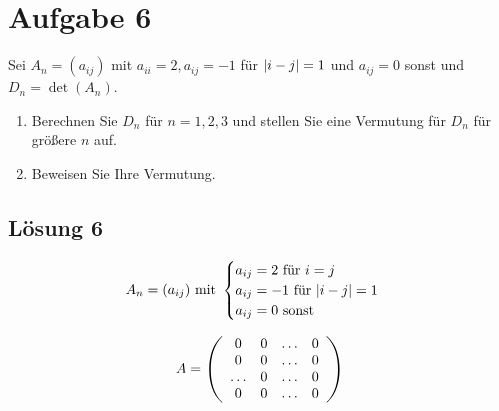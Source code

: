 \documentclass[main.tex]{subfiles}
\begin{document}
\section{Aufgabe 6}
Sei $A_n=(a_{ij})$ mit $a_{ii} = 2, a_{ij} = -1$ für $\abs{i-j} = 1$ und $a_{ij} = 0$ sonst und $D_n = \det(A_n)$.
\begin{enumerate}
    \item Berechnen Sie $D_n$ für $n= 1, 2, 3$ und stellen Sie eine Vermutung für $D_n$ für größere $n$ auf.
    \item Beweisen Sie Ihre Vermutung.
\end{enumerate}

\subsection{Lösung 6}

$$
    A_n =
            (a_{ij}) \text{ mit } \begin{cases}
                a_{ij} = 2 \text{ für } i = j \\
                a_{ij} = -1 \text{ für } \abs{i -j} = 1 \\
                a_{ij} = 0 \text { sonst}
            \end{cases}
$$

\begin{align*}
    A = \eqmatrix{cccc}{
        0 & 0 & \dots & 0 \\
        0 & 0 & \dots & 0 \\
        \dots & 0 & \dots & 0 \\
        0 & 0 & \dots & 0 \\
    }
\end{align*}
\end{document}
